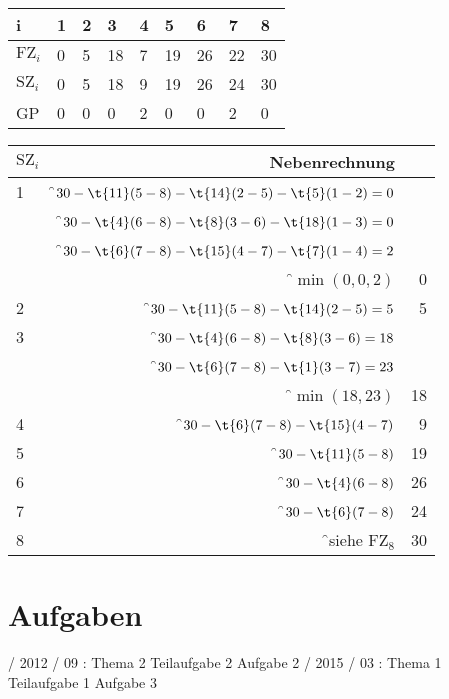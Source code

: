 \documentclass{lehramt-informatik-haupt}
\begin{document}
\begin{tabular}{|l|l|l|l|l|l|l|l|l|}
\hline
i             & 1 & 2 & 3  & 4 & 5  & 6  & 7  & 8 \\\hline\hline
$\text{FZ}_i$ & 0 & 5 & 18 & 7 & 19 & 26 & 22 & 30 \\\hline
$\text{SZ}_i$ & 0 & 5 & 18 & 9 & 19 & 26 & 24 & 30 \\\hline
GP            & 0 & 0 & 0  & 2 & 0  & 0  & 2  & 0 \\\hline
\end{tabular}

\bigskip

\bigskip

\begin{tabular}{|l|r|r|}
\hline
$\text{SZ}_i$ & Nebenrechnung & \\
\hline\hline
1             & \f$30 - \t{11}(5-8) - \t{14}(2-5) -\t{5}(1-2) = 0$ & \\
              & \f$30 - \t{4}(6-8) - \t{8}(3-6) - \t{18}(1-3) = 0$ & \\
              & \f$30 - \t{6}(7-8) - \t{15}(4-7) - \t{7}(1-4) = 2$ & \\
              & \f$\min(0,0,2)$ & 0 \\\hline

2             & \f$30 - \t{11}(5-8) - \t{14}(2-5) = 5$ & 5 \\\hline
3             & \f$30 - \t{4}(6-8) - \t{8}(3-6) = 18$  & \\
              & \f$30 - \t{6}(7-8) - \t{1}(3-7) = 23$  & \\
              & \f$\min(18,23)$                        & 18 \\\hline

4             & \f$30 - \t{6}(7-8) - \t{15}(4-7)$      & 9 \\\hline
5             & \f$30 - \t{11}(5-8)$                   & 19 \\\hline
6             & \f$30 - \t{4}(6-8)$                    & 26 \\\hline
7             & \f$30 - \t{6}(7-8)$                    & 24 \\\hline
8             & \f{}siehe $\text{FZ}_8$                & 30 \\\hline
\end{tabular}


\chapter{Aufgaben}



 / 2012 / 09 : Thema 2 Teilaufgabe 2 Aufgabe 2
 / 2015 / 03 : Thema 1 Teilaufgabe 1 Aufgabe 3

\literatur
\end{document}

